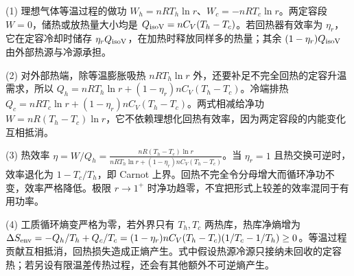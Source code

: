 (1) 理想气体等温过程的做功 \(W_{h}=nRT_h\ln r\)、\(W_c=-nRT_c\ln r\)。两定容段 \(W=0\)，储热或放热量大小均是 \(Q_{\rm isoV}=nC_V(T_h-T_c)\)。若回热器有效率为 \(\eta_r\)，它在定容冷却时储存 \(\eta_r Q_{\rm isoV}\)，在加热时释放同样多的热量；其余 \((1-\eta_r)Q_{\rm isoV}\) 由外部热源与冷源承担。

(2) 对外部热端，除等温膨胀吸热 \(nRT_h\ln r\) 外，还要补足不完全回热的定容升温需求，所以 \(Q_h=nRT_h\ln r+(1-\eta_r)nC_V(T_h-T_c)\)。冷端排热 \(Q_c=nRT_c\ln r+(1-\eta_r)nC_V(T_h-T_c)\)。两式相减给净功 \(W=nR(T_h-T_c)\ln r\)，它不依赖理想化回热有效率，因为两定容段的内能变化互相抵消。

(3) 热效率 \(\eta=W/Q_h=\frac{nR(T_h-T_c)\ln r}{nRT_h\ln r+(1-\eta_r)nC_V(T_h-T_c)}\)。当 \(\eta_r=1\) 且热交换可逆时，效率退化为 \(1-T_c/T_h\)，即 Carnot 上界。回热不完全令分母增大而循环净功不变，效率严格降低。极限 \(r\to1^+\) 时净功趋零，不宜把形式上较差的效率混同于有用功率。

(4) 工质循环熵变严格为零，若外界只有 \(T_h,T_c\) 两热库，热库净熵增为 \(\Delta S_{\rm env}=-Q_h/T_h+Q_c/T_c=(1-\eta_r)nC_V(T_h-T_c)(1/T_c-1/T_h)\ge0\)。等温过程贡献互相抵消，回热损失造成正熵产生。式中假设热源冷源只接纳未回收的定容热；若另设有限温差传热过程，还会有其他额外不可逆熵产生。
